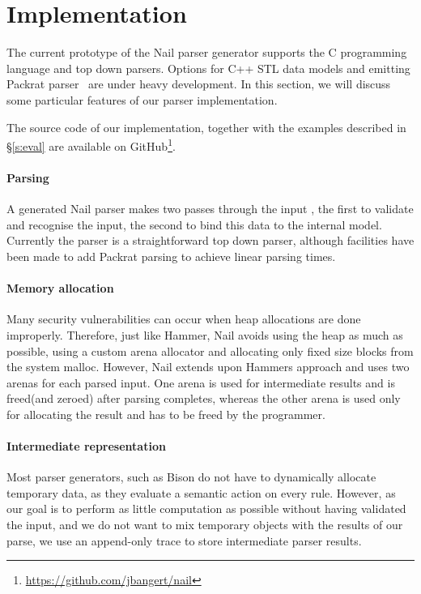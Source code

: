 \section{Implementation}
\label{s:impl}

The current prototype of the Nail parser generator supports the C programming
language and top down parsers. Options for C++ STL data models and emitting
Packrat parser~\cite{packrat-parsing:icfp02} are under heavy development. In
this section, we will discuss some particular features of our parser
implementation.

The source code of our implementation, together with the examples described in
\S\ref{s:eval} are available on GitHub\footnote{\url{https://github.com/jbangert/nail}}.
\paragraph{Parsing}
A generated Nail parser makes two passes through the input , the first to
validate and recognise the input, the second to bind this data to the internal
model. Currently the parser is a straightforward top down parser, although
facilities have been made to add Packrat parsing to achieve linear parsing
times.
\paragraph{Memory allocation}
Many security vulnerabilities can occur when heap allocations are done
improperly. Therefore, just like Hammer, Nail avoids using the heap as much as
possible, using a custom arena allocator and allocating only fixed size blocks
from the system malloc. However, Nail extends upon Hammers approach and uses two
arenas for each parsed input. One arena is used for intermediate results and is
freed(and zeroed) after parsing completes, whereas the other arena is used only
for allocating the result and has to be freed by the programmer.

\paragraph{Intermediate representation}
Most parser generators, such as Bison do not have to dynamically allocate
temporary data, as they evaluate a semantic action on every rule. However, as
our goal is to perform as little computation as possible without having
validated the input, and we do not want to mix temporary objects with the
results of our parse, we use an append-only trace to store intermediate parser
results. 

